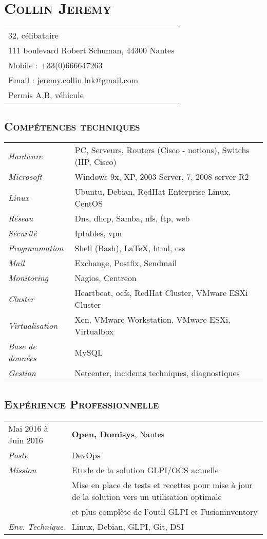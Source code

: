 \documentclass[a4paper,8pt]{article}
\newcommand{\hsection}[1]{\section*{\fontfamily{phv}\selectfont\textsc{#1}}}
\newcommand{\hsubsection}[1]{\subsection*{\fontfamily{phv}\selectfont\textsc{#1}}}
\begin{document}
\selectfont
\hsection{Collin Jeremy}
\begin{tabular}{p{16.5cm}}
\hline
32, célibataire\\
111 boulevard Robert Schuman, 44300 Nantes\\
Mobile : +33(0)666647263\\
Email : jeremy.collin.lnk@gmail.com\\
Permis A,B, véhicule\\
\end{tabular}

\hsubsection{Compétences techniques}
\begin{tabular}{P{3.5cm}|p{13cm}}
\textsl{Hardware}		& PC, Serveurs, Routers (Cisco - notions), Switchs (HP, Cisco)\\
\textsl{Microsoft}		& Windows 9x, XP, 2003 Server, 7, 2008 server R2\\
\textsl{Linux}			& Ubuntu, Debian, RedHat Enterprise Linux, CentOS\\
\textsl{Réseau}			& Dns, dhcp, Samba, nfs, ftp, web\\
\textsl{Sécurité}		& Iptables, vpn\\
\textsl{Programmation}		& Shell (Bash), \LaTeX, html, css\\
\textsl{Mail}			& Exchange, Postfix, Sendmail\\
\textsl{Monitoring}		& Nagios, Centreon\\
\textsl{Cluster}		& Heartbeat, ocfs, RedHat Cluster, VMware ESXi Cluster\\
\textsl{Virtualisation}		& Xen, VMware Workstation, VMware ESXi, Virtualbox\\
\textsl{Base de données}	& MySQL\\
\textsl{Gestion}		& Netcenter, incidents techniques, diagnostiques\\
\end{tabular}

\hsubsection{Expérience Professionnelle}
\begin{tabular}{P{3.5cm}|p{13cm}}
Mai 2016 à Juin 2016		& \textbf{Open, Domisys}, Nantes\\
\textsl{Poste}			& DevOps\\
\textsl{Mission}		& Etude de la solution GLPI/OCS actuelle\\
				& Mise en place de tests et recettes pour mise à jour de la solution vers un utilisation optimale\\
				& et plus complète de l'outil GLPI et Fusioninventory\\
\textsl{Env. Technique}		& Linux, Debian, GLPI, Git, DSI \\
\end{tabular}
\end{document}
